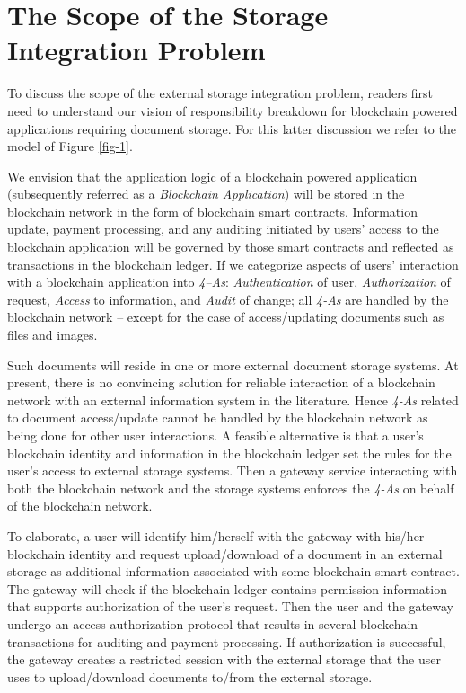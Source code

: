 \section{The Scope of the Storage Integration Problem}
\label{s-scope}
To discuss the scope of the external storage integration problem, readers first need to understand our vision of responsibility breakdown for blockchain powered applications requiring document storage. For this latter discussion we refer to the model of Figure \ref{fig-1}.

We envision that the application logic of a blockchain powered application (subsequently referred as a \textit{Blockchain Application}) will be stored in the blockchain network in the form of blockchain smart contracts. Information update, payment processing, and any auditing initiated by users' access to the blockchain application will be governed by those smart contracts and reflected as transactions in the blockchain ledger. If we categorize aspects of users' interaction with a blockchain application into \textit{4--As}: \textit{Authentication} of user, \textit{Authorization} of request, \textit{Access} to information, and \textit{Audit} of change; all \textit{4-As} are handled by the blockchain network -- except for the case of access/updating documents such as files and images.

Such documents will reside in one or more external document storage systems. At present, there is no convincing solution for reliable interaction of a blockchain network with an external information system in the literature. Hence \textit{4-As} related to document access/update cannot be handled by the blockchain network as being done for other user interactions. A feasible alternative is that a user's blockchain identity and information in the blockchain ledger set the rules for the user's access to external storage systems. Then a gateway service interacting with both the blockchain network and the storage systems enforces the \textit{4-As} on behalf of the blockchain network.

To elaborate, a user will identify him/herself with the gateway with his/her blockchain identity and request upload/download of a document in an external storage as additional information associated with some blockchain smart contract. The gateway will check if the blockchain ledger contains permission information that supports authorization of the user's request. Then the user and the gateway undergo an access authorization protocol that results in several blockchain transactions for auditing and payment processing. If authorization is successful, the gateway creates a restricted session with the external storage that the user uses to upload/download documents to/from the external storage.

